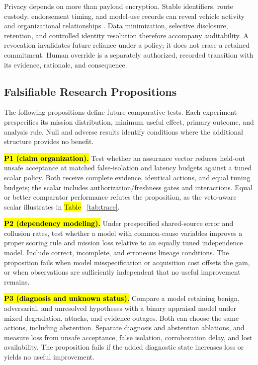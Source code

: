 \documentclass[blockchains,review,accept,moreauthors]{Definitions/mdpi}
\begin{document}
Privacy depends on more than payload encryption. Stable identifiers, route custody, endorsement timing, and model-use records can reveal vehicle activity and organizational relationships \citep{reyna2018blockchain,kshetri2017can}. Data minimization, selective disclosure, retention, and controlled identity resolution therefore accompany auditability. A revocation invalidates future reliance under a policy; it does not erase a retained commitment. Human override is a separately authorized, recorded transition with its evidence, rationale, and consequence.

\subsection{Falsifiable Research Propositions}\label{sec:propositions}

The following propositions define future comparative tests. Each experiment prespecifies its mission distribution, minimum useful effect, primary outcome, and analysis rule. Null and adverse results identify conditions where the additional structure provides no benefit.

\textbf{\hl{P1 (claim organization).}} Test whether an assurance vector reduces held-out unsafe acceptance at matched false-isolation and latency budgets against a tuned scalar policy. Both receive complete evidence, identical actions, and equal tuning budgets; the scalar includes authorization/freshness gates and interactions. Equal or better comparator performance refutes the proposition, as the veto-aware scalar illustrates in \hl{Table}%
~\ref{tab:trace}.

\textbf{\hl{P2 (dependency modeling).}} Under prespecified shared-source error and collusion rates, test whether a model with common-cause variables improves a proper scoring rule and mission loss relative to an equally tuned independence model. Include correct, incomplete, and erroneous lineage conditions. The proposition fails when model misspecification or acquisition cost offsets the gain, or when observations are sufficiently independent that no useful improvement remains.

\textbf{\hl{P3 (diagnosis and unknown status).}} Compare a model retaining benign, adversarial, and unresolved hypotheses with a binary appraisal model under mixed degradation, attacks, and evidence outages. Both can choose the same actions, including abstention. Separate diagnosis and abstention ablations, and measure loss from unsafe acceptance, false isolation, corroboration delay, and lost availability. The proposition fails if the added diagnostic state increases loss or yields no useful improvement.
\end{document}
